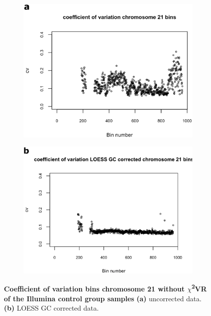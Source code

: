 \begin{figure}[!hb]
	\begin{subfigure}{.5\textwidth}
		\centering
		\includegraphics[width=1\linewidth]{img/NIPT_Supp1_Fig1_2a}
		\label{fig:NIPT_Supp1_Fig1_2a}
	\end{subfigure}%
	\begin{subfigure}{.5\textwidth}
		\centering
		\includegraphics[width=1\linewidth]{img/NIPT_Supp1_Fig1_2b}
		\label{fig:NIPT_Supp1_Fig1_2b}
	\end{subfigure} 
	\caption[Example CV per bin with and without $\chi$\textsuperscript{2}VR]{\textbf{Coefficient of variation bins chromosome 21 without $\chi$\textsuperscript{2}VR of the Illumina control group samples} \textbf{(a)} uncorrected data. \textbf{(b)} LOESS GC corrected data.}
	\label{fig:NIPT_Supp1_Fig1_2}
\end{figure}

